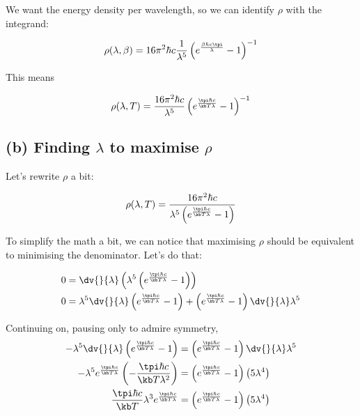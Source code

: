 \documentclass[../../PS3.tex]{subfiles}
\begin{document}
We want the energy density per wavelength, so we can identify $\rho$ with the integrand:

\begin{equation}
	\rho(\lambda,\beta) = 16 \pi^2 \hbar c \frac{1}{\lambda^5} \left(e^{ \frac{\beta \hbar c \tpi}{\lambda}} - 1\right)^{-1}
\end{equation}

This means 

\begin{equation} \label{eq:P1:rhoans}
	\rho(\lambda,T) =  \frac{16 \pi^2 \hbar c}{\lambda^5} \left(e^{ \frac{\tpi \hbar c }{\kb T \lambda}} - 1\right)^{-1}
\end{equation}

\subsection*{(b) Finding $\lambda$ to maximise $\rho$}

Let's rewrite $\rho$ a bit:

\begin{equation}
	\rho(\lambda,T) =  \frac{16 \pi^2 \hbar c}{\lambda^5 \left(e^{ \frac{\tpi \hbar c }{\kb T \lambda}} - 1\right)}
\end{equation}

To simplify the math a bit, we can notice that maximising $\rho$ should be equivalent to minimising the denominator. Let's do that:

\begin{align}
	0 &= \dv{}{\lambda} \left( \lambda^5 \left(e^{ \frac{\tpi \hbar c }{\kb T \lambda}} - 1\right)\right) \\
	0 &= \lambda^5 \dv{}{\lambda} \left(e^{ \frac{\tpi \hbar c }{\kb T \lambda}} - 1\right) + \left(e^{ \frac{\tpi \hbar c }{\kb T \lambda}} - 1\right)\dv{}{\lambda} \lambda^5 
\end{align}

Continuing on, pausing only to admire symmetry,
\begin{align}
	- \lambda^5 \dv{}{\lambda} \left(e^{ \frac{\tpi \hbar c }{\kb T \lambda}} - 1\right) &= \left(e^{ \frac{\tpi \hbar c }{\kb T \lambda}} - 1\right)\dv{}{\lambda} \lambda^5 \\
	- \lambda^5 e^{ \frac{\tpi \hbar c }{\kb T \lambda}} \left( -\frac{\tpi \hbar c }{\kb T \lambda^2}\right) &= \left(e^{ \frac{\tpi \hbar c }{\kb T \lambda}} - 1\right)\left(5 \lambda^4\right) \\	
	\frac{\tpi \hbar c }{\kb T } \lambda^3 e^{ \frac{\tpi \hbar c }{\kb T \lambda}}  &= \left(e^{ \frac{\tpi \hbar c }{\kb T \lambda}} - 1\right)\left(5 \lambda^4\right)
\end{align}
\end{document}
